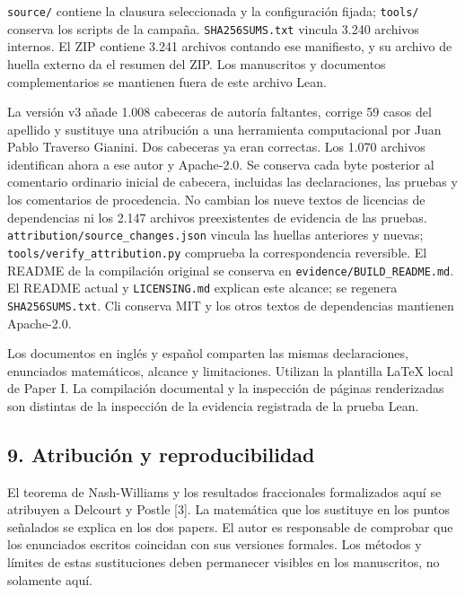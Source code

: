 \documentclass[spanish,11pt,a4paper]{article}
\begin{document}
\texttt{source/\allowbreak{}} contiene la clausura seleccionada y la configuración fijada; \texttt{tools/\allowbreak{}} conserva los scripts de la campaña. \texttt{SHA256SUMS.\allowbreak{}txt} vincula 3.240 archivos internos. El ZIP contiene 3.241 archivos contando ese manifiesto, y su archivo de huella externo da el resumen del ZIP. Los manuscritos y documentos complementarios se mantienen fuera de este archivo Lean.

La versión v3 añade 1.008 cabeceras de autoría faltantes, corrige 59 casos del apellido y sustituye una atribución a una herramienta computacional por Juan Pablo Traverso Gianini. Dos cabeceras ya eran correctas. Los 1.070 archivos identifican ahora a ese autor y Apache-2.0. Se conserva cada byte posterior al comentario ordinario inicial de cabecera, incluidas las declaraciones, las pruebas y los comentarios de procedencia. No cambian los nueve textos de licencias de dependencias ni los 2.147 archivos preexistentes de evidencia de las pruebas. \texttt{attribution/\allowbreak{}source\_\allowbreak{}changes.\allowbreak{}json} vincula las huellas anteriores y nuevas; \texttt{tools/\allowbreak{}verify\_\allowbreak{}attribution.\allowbreak{}py} comprueba la correspondencia reversible. El README de la compilación original se conserva en \texttt{evidence/\allowbreak{}BUILD\_\allowbreak{}README.\allowbreak{}md}. El README actual y \texttt{LICENSING.\allowbreak{}md} explican este alcance; se regenera \texttt{SHA256SUMS.\allowbreak{}txt}. Cli conserva MIT y los otros textos de dependencias mantienen Apache-2.0.

Los documentos en inglés y español comparten las mismas declaraciones, enunciados matemáticos, alcance y limitaciones. Utilizan la plantilla LaTeX local de Paper I. La compilación documental y la inspección de páginas renderizadas son distintas de la inspección de la evidencia registrada de la prueba Lean.

\subsection{9. Atribución y reproducibilidad}\label{atribuciuxf3n-y-reproducibilidad}

El teorema de Nash-Williams y los resultados fraccionales formalizados aquí se atribuyen a Delcourt y Postle {[}3{]}. La matemática que los sustituye en los puntos señalados se explica en los dos papers. El autor es responsable de comprobar que los enunciados escritos coincidan con sus versiones formales. Los métodos y límites de estas sustituciones deben permanecer visibles en los manuscritos, no solamente aquí.
\end{document}
